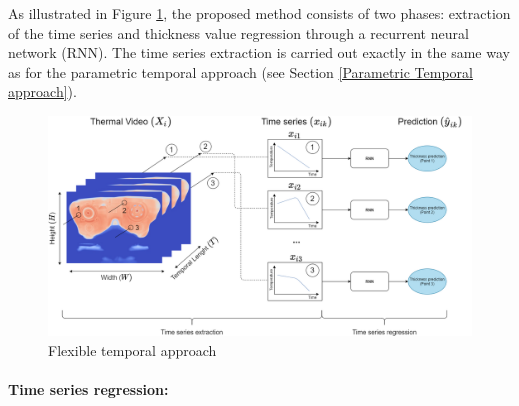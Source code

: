 As illustrated in Figure \ref{fig:temporal_approach}, the proposed method consists of two phases: extraction of the time series and thickness value regression through a recurrent neural network (RNN). The time series extraction is carried out exactly in the same way as for the parametric temporal approach (see Section \ref{Parametric Temporal approach}).  

\begin{figure}
\centering
\includegraphics[scale=0.4]{images/chapter_4/Flexible_Temporal.png}
\caption{Flexible temporal approach}
\label{fig:temporal_approach}
\end{figure}

\paragraph{Time series regression:}

